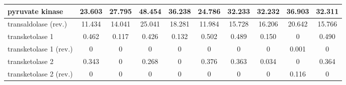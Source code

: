 \begin{table}[H]
{\begin{tabular}{|l|c|c|c|c|c|c|c|c|c|}
  pyruvate kinase                                                                                      & 23.603             & 27.795             & 48.454            & 36.238                                                                 & 24.786        & 32.233          & 32.232                 & 36.903          & 32.311            \\ \hline
  transaldolase (rev.)                                                                              & 11.434             & 14.041             & 25.041            & 18.281                                                                 & 11.984        & 15.728          & 16.206                 & 20.642          & 15.766            \\ \hline
  transketolase 1                                                                                      & 0.462              & 0.117              & 0.426             & 0.132                                                                  & 0.502         & 0.489           & 0.150                  & 0               & 0.490             \\ \hline
  transketolase 1 (rev.)                                                                            & 0                  & 0                  & 0                 & 0                                                                      & 0             & 0               & 0                      & 0.001           & 0                 \\ \hline
  transketolase 2                                                                                      & 0.343              & 0                  & 0.268             & 0                                                                      & 0.376         & 0.363           & 0.034                  & 0               & 0.364             \\ \hline
  transketolase 2 (rev.)                                                                            & 0                  & 0                  & 0                 & 0                                                                      & 0             & 0               & 0                      & 0.116           & 0                 \\ \hline
  \end{tabular}}
\end{table}
